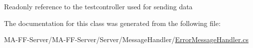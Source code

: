 Readonly reference to the testcontroller used for sending data 



The documentation for this class was generated from the following file\+:\begin{DoxyCompactItemize}
\item 
M\+A-\/\+F\+F-\/\+Server/\+M\+A-\/\+F\+F-\/\+Server/\+Server/\+Message\+Handler/\hyperlink{_error_message_handler_8cs}{Error\+Message\+Handler.\+cs}\end{DoxyCompactItemize}
